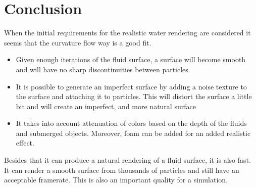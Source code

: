 \section{Conclusion}
When the initial requirements for the realistic water rendering are considered it seems that the curvature flow way is a good fit.
\begin{itemize}
\item Given enough iterations of the fluid surface, a surface will become smooth and will have no sharp discontinuities between particles.
\item It is possible to generate an imperfect surface by adding a noise texture to the surface and attaching it to particles. This will distort the surface a little bit and will create an imperfect, and more natural surface
\item It takes into account attenuation of colors based on the depth of the fluids and submerged objects. Moreover, foam can be added for an added realistic effect.
\end{itemize}
Besides that it can produce a natural rendering of a fluid surface, it is also fast. 
It can render a smooth surface from thousands of particles and still have an acceptable framerate. 
This is also an important quality for a simulation.
